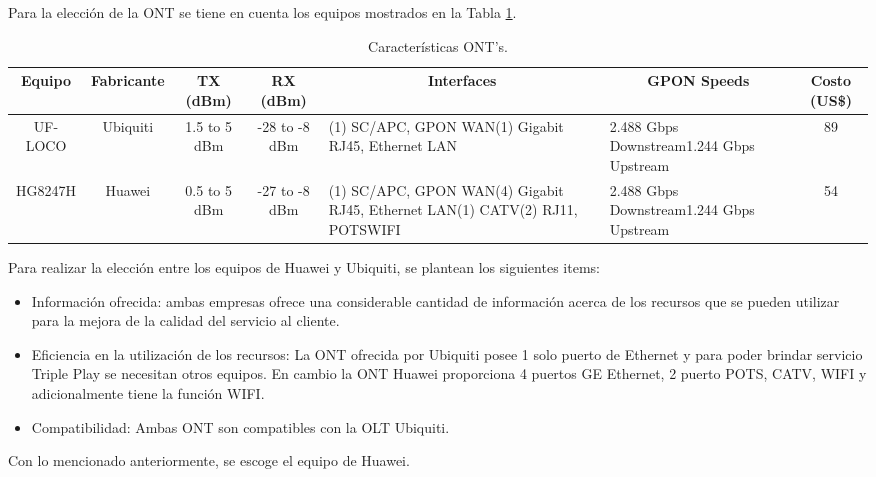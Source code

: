\begin{enumerate}
\begin{enumerate}
Para la elección de la ONT se tiene en cuenta los equipos mostrados en la Tabla \ref{tab:caracteristicas-ont}.


\begin{table}[H]
  \tiny
  \centering
    \begin{tabular}{|c|c|c|c|p{15.61em}|p{12.5em}|c|}
    \hline
    \rowcolor[rgb]{ .773,  .851,  .945} \textbf{Equipo} & \textbf{Fabricante} & \textbf{TX (dBm)} & \textbf{RX (dBm)} & \multicolumn{1}{c|}{\textbf{Interfaces}} & \multicolumn{1}{c|}{\textbf{GPON Speeds}} & \textbf{Costo (US\$)} \bigstrut\\
    \hline
    UF-LOCO & Ubiquiti & 1.5 to 5 dBm & -28 to -8 dBm & (1) SC/APC, GPON WAN\newline{}(1) Gigabit RJ45, Ethernet LAN\newline{} & 2.488 Gbps Downstream\newline{}1.244 Gbps Upstream & 89 \bigstrut\\
    \hline
    HG8247H & Huawei & 0.5 to 5 dBm & -27  to -8 dBm & (1) SC/APC, GPON WAN\newline{}(4) Gigabit RJ45, Ethernet LAN\newline{}(1) CATV\newline{}(2) RJ11, POTS\newline{}WIFI\newline{} & 2.488 Gbps Downstream\newline{}1.244 Gbps Upstream & 54 \bigstrut\\
    \hline
    \end{tabular}%
	\caption{Características ONT's.}
  \label{tab:caracteristicas-ont}%
\end{table}%

Para realizar la elección entre los equipos de Huawei y Ubiquiti, se plantean los siguientes items:

\begin{itemize}
\item Información ofrecida: ambas empresas ofrece una considerable cantidad de información acerca de los recursos que se pueden utilizar para la mejora de la calidad del servicio al cliente.
\item Eficiencia en la utilización de los recursos: La ONT ofrecida por Ubiquiti posee 1 solo puerto de Ethernet y para poder brindar servicio Triple Play se necesitan otros equipos. En cambio la ONT Huawei proporciona 4 puertos GE Ethernet, 2 puerto POTS, CATV, WIFI y adicionalmente tiene la función WIFI. 
\item Compatibilidad: Ambas ONT son compatibles con la OLT Ubiquiti.
\end{itemize}
Con lo mencionado anteriormente, se escoge el equipo de Huawei.


\end{enumerate}
\end{enumerate}
